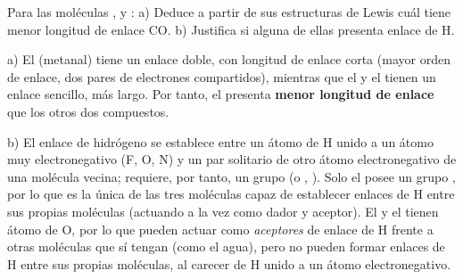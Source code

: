 \begin{exercise}
    Para las moléculas ,  y :
    a) Deduce a partir de sus estructuras de Lewis cuál tiene
    menor longitud de enlace CO.
    b) Justifica si alguna de ellas presenta enlace de H.
    \begin{solu}
        a) El  (metanal) tiene un enlace  doble, con longitud de enlace corta (mayor orden de enlace, dos pares de electrones compartidos), mientras que el  y el  tienen un enlace  sencillo, más largo. Por tanto, el  presenta \textbf{menor longitud de enlace } que los otros dos compuestos.

        b) El enlace de hidrógeno se establece entre un átomo de H unido a un átomo muy electronegativo (F, O, N) y un par solitario de otro átomo electronegativo de una molécula vecina; requiere, por tanto, un grupo  (o , ). Solo el  posee un grupo , por lo que es la única de las tres moléculas capaz de establecer enlaces de H entre sus propias moléculas (actuando a la vez como dador y aceptor). El  y el  tienen átomo de O, por lo que pueden actuar como \emph{aceptores} de enlace de H frente a otras moléculas que sí tengan  (como el agua), pero no pueden formar enlaces de H entre sus propias moléculas, al carecer de H unido a un átomo electronegativo.
    \end{solu}
\end{exercise}

